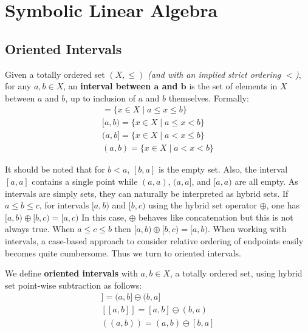 \chapter{Symbolic Linear Algebra}


\section{Oriented Intervals}

\begin{definition}
	Given a totally ordered set $(X, \leq)$ \emph{(and with an implied strict ordering $<$)}, 
	for any $a,b \in X$, an \textbf{interval between $\boldsymbol{a}$ and $\boldsymbol{b}$} 
	is the set of elements in $X$ between $a$ and $b$, up to inclusion of $a$ and $b$ themselves. 
	Formally:
	\begin{align}
		[a,b] = \{ x \in X \;|\; a \leq x \leq b \} \\
		[a,b) = \{ x \in X \;|\; a \leq x < b \} \\
		(a,b] = \{ x \in X \;|\; a < x \leq b \} \\
		(a,b) = \{ x \in X \;|\; a < x < b \}
	\end{align}
\end{definition}

It should be noted that for $b<a$, $[b,a]$ is the empty set. 
Also, the interval $[a,a]$ contains a single point while $(a,a)$, $(a,a]$, and $[a,a)$ are all empty.
As intervals are simply sets, they can naturally be interpreted as hybrid sets.
If $a \leq b \leq c$, for intervals $[a,b)$ and $[b,c)$ using the hybrid set operator $\oplus$, one has
$[a,b) \oplus [b,c) = [a,c)$
In this case, $\oplus$ behaves like concatenation but this is not always true.
When $a \leq c \leq b$ then $[a,b) \oplus [b,c) = [a,b)$.
When working with intervals, a case-based approach to consider relative ordering of endpoints easily becomes quite cumbersome.
Thus we turn to oriented intervals.

\begin{definition}
	We define \textbf{oriented intervals} with $a,b\in X$, a totally ordered set, 
	using hybrid set point-wise subtraction as follows:
	\begin{align}
		[\![ a,b )\!) = [a,b) \ominus [b,a) \\
		(\!( a,b ]\!] = (a,b] \ominus (b,a] \\
		[\![ a,b ]\!] = [a,b] \ominus (b,a) \\
		(\!( a,b )\!) = (a,b) \ominus [b,a]
	\end{align}
\end{definition}

